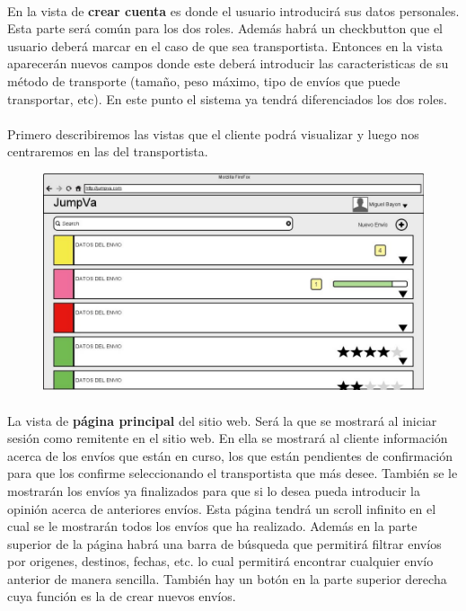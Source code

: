 \documentclass[10pt, a4paper,spanish]{article}
\begin{document}
		\paragraph{}
		En la vista de \textbf{crear cuenta} es donde el usuario introducirá sus datos personales. Esta parte será común para los dos roles. Además habrá un checkbutton que el usuario deberá marcar en el caso de que sea transportista. Entonces en la vista aparecerán nuevos campos donde este deberá introducir las caracteristicas de su método de transporte (tamaño, peso máximo, tipo de envíos que puede transportar, etc). En este punto el sistema ya tendrá diferenciados los dos roles.

		\paragraph{}
		Primero describiremos las vistas que el cliente podrá visualizar y luego nos centraremos en las del transportista.

		\begin{figure}[H]
			\centering
			\begin{minipage}[b]{0.8\textwidth}
				\includegraphics[width=\textwidth]{res/PaginaPrincipal.png}
			\end{minipage}
		\end{figure}

		\paragraph{}
		La vista de \textbf{página principal} del sitio web. Será la que se mostrará al iniciar sesión como remitente en el sitio web. En ella se mostrará al cliente información acerca de los envíos que están en curso, los que están pendientes de confirmación para que los confirme seleccionando el transportista que más desee. También se le mostrarán los envíos ya finalizados para que si lo desea pueda introducir la opinión acerca de anteriores envíos. Esta página tendrá un scroll infinito en el cual se le mostrarán todos los envíos que ha realizado. Además en la parte superior de la página habrá una barra de búsqueda que permitirá filtrar envíos por origenes, destinos, fechas, etc. lo cual permitirá encontrar cualquier envío anterior de manera sencilla. También hay un botón en la parte superior derecha cuya función es la de crear nuevos envíos.
\end{document}
